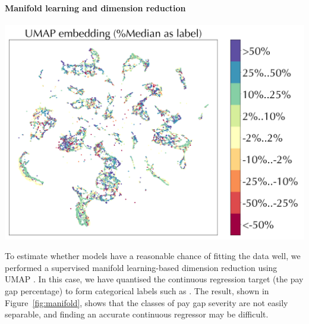 \paragraph*{Manifold learning and dimension reduction} 

\begin{centering}
    \includegraphics[width=0.99\linewidth]{images/umap-median.png}
    \label{fig:manifold}
\end{centering}

To estimate whether models have a reasonable chance of fitting the data well, we performed a supervised manifold learning-based dimension reduction using UMAP \cite{mcinnes2018umap}. In this case, we have quantised the continuous regression target (the pay gap percentage) to form categorical labels such as . The result, shown in Figure\ \ref{fig:manifold}, shows that the classes of pay gap severity are not easily separable, and finding an accurate continuous regressor may be difficult. 


